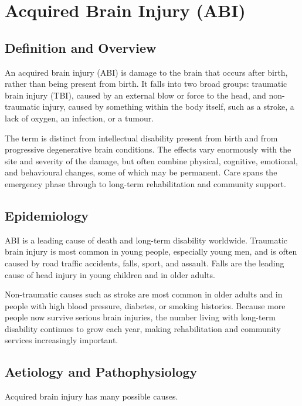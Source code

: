 \chapter{Acquired Brain Injury (ABI)}

\section*{Definition and Overview}
An acquired brain injury (ABI) is damage to the brain that occurs after birth, rather than being present from birth. It falls into two broad groups: traumatic brain injury (TBI), caused by an external blow or force to the head, and non-traumatic injury, caused by something within the body itself, such as a stroke, a lack of oxygen, an infection, or a tumour.

The term is distinct from intellectual disability present from birth and from progressive degenerative brain conditions. The effects vary enormously with the site and severity of the damage, but often combine physical, cognitive, emotional, and behavioural changes, some of which may be permanent. Care spans the emergency phase through to long-term rehabilitation and community support.

\section*{Epidemiology}
ABI is a leading cause of death and long-term disability worldwide. Traumatic brain injury is most common in young people, especially young men, and is often caused by road traffic accidents, falls, sport, and assault. Falls are the leading cause of head injury in young children and in older adults.

Non-traumatic causes such as stroke are most common in older adults and in people with high blood pressure, diabetes, or smoking histories. Because more people now survive serious brain injuries, the number living with long-term disability continues to grow each year, making rehabilitation and community services increasingly important.

\section*{Aetiology and Pathophysiology}
Acquired brain injury has many possible causes.

